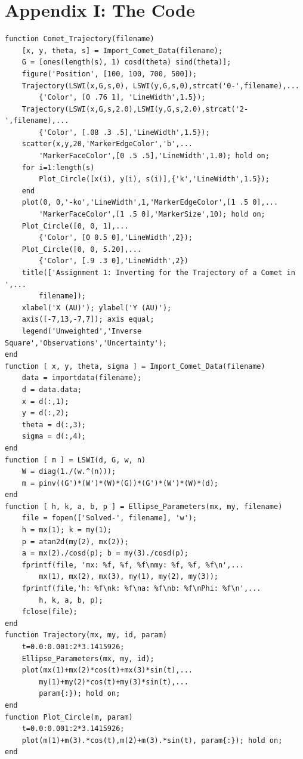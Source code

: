 \documentclass[12pt,runningheads]{article}
\begin{document}
\section*{Appendix I: The Code}
\begin{verbatim}
function Comet_Trajectory(filename)
    [x, y, theta, s] = Import_Comet_Data(filename);
    G = [ones(length(s), 1) cosd(theta) sind(theta)];
    figure('Position', [100, 100, 700, 500]);
    Trajectory(LSWI(x,G,s,0), LSWI(y,G,s,0),strcat('0-',filename),...
        {'Color', [0 .76 1], 'LineWidth',1.5});
    Trajectory(LSWI(x,G,s,2.0),LSWI(y,G,s,2.0),strcat('2-',filename),...
        {'Color', [.08 .3 .5],'LineWidth',1.5});
    scatter(x,y,20,'MarkerEdgeColor','b',...
        'MarkerFaceColor',[0 .5 .5],'LineWidth',1.0); hold on;
    for i=1:length(s)
        Plot_Circle([x(i), y(i), s(i)],{'k','LineWidth',1.5});
    end
    plot(0, 0,'-ko','LineWidth',1,'MarkerEdgeColor',[1 .5 0],...
        'MarkerFaceColor',[1 .5 0],'MarkerSize',10); hold on;
    Plot_Circle([0, 0, 1],...
        {'Color', [0 0.5 0],'LineWidth',2});
    Plot_Circle([0, 0, 5.20],...
        {'Color', [.9 .3 0],'LineWidth',2})
    title(['Assignment 1: Inverting for the Trajectory of a Comet in ',...
        filename]);
    xlabel('X (AU)'); ylabel('Y (AU)');
    axis([-7,13,-7,7]); axis equal; 
    legend('Unweighted','Inverse Square','Observations','Uncertainty');
end
function [ x, y, theta, sigma ] = Import_Comet_Data(filename)
    data = importdata(filename);
    d = data.data;
    x = d(:,1);
    y = d(:,2);
    theta = d(:,3);
    sigma = d(:,4);
end
function [ m ] = LSWI(d, G, w, n)
    W = diag(1./(w.^(n)));
    m = pinv((G')*(W')*(W)*(G))*(G')*(W')*(W)*(d);
end
function [ h, k, a, b, p ] = Ellipse_Parameters(mx, my, filename)
    file = fopen(['Solved-', filename], 'w');
    h = mx(1); k = my(1);
    p = atan2d(my(2), mx(2));
    a = mx(2)./cosd(p); b = my(3)./cosd(p);
    fprintf(file, 'mx: %f, %f, %f\nmy: %f, %f, %f\n',...
        mx(1), mx(2), mx(3), my(1), my(2), my(3));
    fprintf(file,'h: %f\nk: %f\na: %f\nb: %f\nPhi: %f\n',...
        h, k, a, b, p);
    fclose(file);
end
function Trajectory(mx, my, id, param)
    t=0.0:0.001:2*3.1415926;
    Ellipse_Parameters(mx, my, id);
    plot(mx(1)+mx(2)*cos(t)+mx(3)*sin(t),...
        my(1)+my(2)*cos(t)+my(3)*sin(t),...
        param{:}); hold on;
end
function Plot_Circle(m, param)
    t=0.0:0.001:2*3.1415926;
    plot(m(1)+m(3).*cos(t),m(2)+m(3).*sin(t), param{:}); hold on;
end
\end{verbatim}
\end{document}
